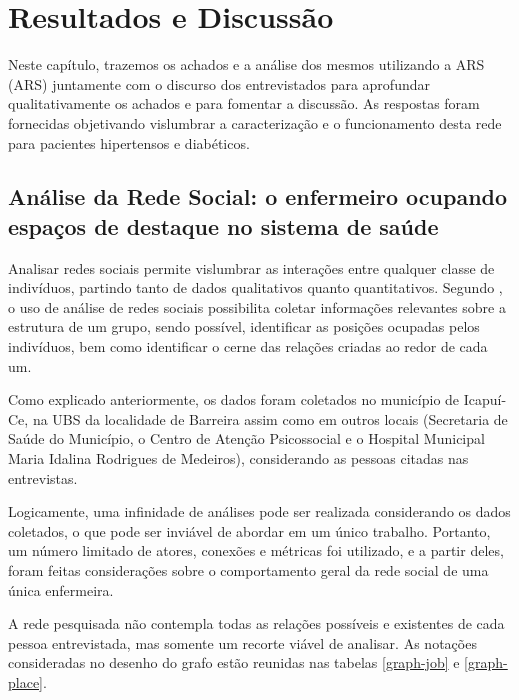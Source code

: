 \chapter{Resultados e Discussão}
\label{chap:resultados}

Neste capítulo, trazemos os achados e a análise dos mesmos utilizando a \acrlong{ARS} (\acrshort{ARS}) juntamente com o discurso dos entrevistados para aprofundar qualitativamente os achados e para fomentar a discussão.  As respostas foram fornecidas objetivando vislumbrar a caracterização e o funcionamento desta rede para pacientes hipertensos e diabéticos. 

\section{Análise da Rede Social: o enfermeiro ocupando espaços de destaque no sistema de saúde}

Analisar redes sociais permite vislumbrar as interações entre qualquer classe de indivíduos, partindo tanto de dados qualitativos quanto quantitativos. Segundo \cite{stanley1994social},  o uso de  análise de redes sociais possibilita coletar informações relevantes sobre a estrutura de um grupo, sendo possível, identificar as posições ocupadas pelos indivíduos, bem como identificar o cerne das relações criadas ao redor de cada um.

Como explicado anteriormente, os dados foram coletados no município de Icapuí-Ce, na \acrlong{UBS} da localidade de Barreira assim como em outros locais (Secretaria de Saúde do Município, o Centro de Atenção Psicossocial e o Hospital Municipal Maria Idalina Rodrigues de Medeiros), considerando as pessoas citadas nas entrevistas.

Logicamente, uma infinidade de análises pode ser realizada considerando os dados coletados, o que pode ser inviável de abordar em um único trabalho. Portanto, um número limitado de atores, conexões e métricas foi utilizado, e a partir deles, foram feitas considerações sobre o comportamento geral da rede social de uma única enfermeira. 

A rede pesquisada não contempla todas as relações possíveis e existentes de cada pessoa entrevistada, mas somente um recorte viável de analisar. As notações consideradas no desenho do grafo estão reunidas nas tabelas \ref{graph-job} e \ref{graph-place}.


